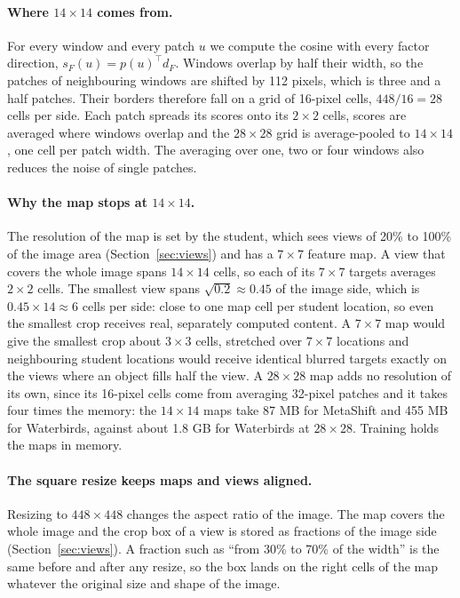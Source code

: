 \documentclass{article}
\begin{document}
\paragraph{Where $14\times14$ comes from.}
For every window and every patch $u$ we compute the cosine with every factor direction, $s_F(u)=p(u)^\top d_F$. Windows overlap by half their width, so the patches of neighbouring windows are shifted by 112 pixels, which is three and a half patches. Their borders therefore fall on a grid of 16-pixel cells, $448/16=28$ cells per side. Each patch spreads its scores onto its $2\times2$ cells, scores are averaged where windows overlap and the $28\times28$ grid is average-pooled to $14\times14$, one cell per patch width. The averaging over one, two or four windows also reduces the noise of single patches.

\paragraph{Why the map stops at $14\times14$.}
The resolution of the map is set by the student, which sees views of 20\% to 100\% of the image area (Section~\ref{sec:views}) and has a $7\times7$ feature map. A view that covers the whole image spans $14\times14$ cells, so each of its $7\times7$ targets averages $2\times2$ cells. The smallest view spans $\sqrt{0.2}\approx0.45$ of the image side, which is $0.45\times14\approx6$ cells per side: close to one map cell per student location, so even the smallest crop receives real, separately computed content. A $7\times7$ map would give the smallest crop about $3\times3$ cells, stretched over $7\times7$ locations and neighbouring student locations would receive identical blurred targets exactly on the views where an object fills half the view. A $28\times28$ map adds no resolution of its own, since its 16-pixel cells come from averaging 32-pixel patches and it takes four times the memory: the $14\times14$ maps take 87 MB for MetaShift and 455 MB for Waterbirds, against about 1.8 GB for Waterbirds at $28\times28$. Training holds the maps in memory.

\paragraph{The square resize keeps maps and views aligned.}
Resizing to $448\times448$ changes the aspect ratio of the image. The map covers the whole image and the crop box of a view is stored as fractions of the image side (Section~\ref{sec:views}). A fraction such as ``from 30\% to 70\% of the width'' is the same before and after any resize, so the box lands on the right cells of the map whatever the original size and shape of the image.
\end{document}
